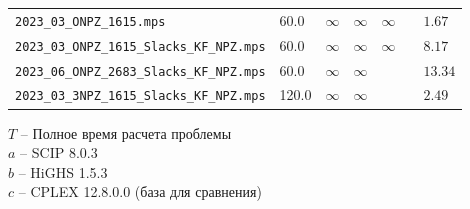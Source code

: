 \documentclass[%
	11pt,
	a4paper,
	utf8,
		]{article}
\begin{document}
\begin{landscape}
{\begin{table}[!h]
\begin{tabular}{ p{} | p{1.4cm} | p{0.7cm} | p{2.3cm} | p{2.5cm} | p{2.7cm} | p{1.4cm} }
			\rowcolor{blue!3}\texttt{2023\_03\_ONPZ\_1615.mps} & 60.0 & $ \infty $ & $ \infty $ & $ \infty $ & \ccg{$ 1.31 (+21.72\%) $} & $ 1.67 $\\
			\rowcolor{black!5}\texttt{2023\_03\_ONPZ\_1615\_Slacks\_KF\_NPZ.mps} & 60.0 & $ \infty $ & $ \infty $ & $ \infty $ & \ccb{ $ 10.13 (-24.10\%) $ } & $ 8.17 $ \\
			\rowcolor{blue!3}\texttt{2023\_06\_ONPZ\_2683\_Slacks\_KF\_NPZ.mps} & 60.0 & $ \infty $ & $ \infty $ & \ccg{ $ 6.40 (+52.05\%) $ } & \ccg{ $ 3.54 (+73.48\%) $ } & $ 13.34 $ \\
			\noalign{\smallskip}  
			\rowcolor{black!5}\texttt{2023\_03\_3NPZ\_1615\_Slacks\_KF\_NPZ.mps} &120.0 & $ \infty $ & $ \infty $ & \ccb{$ 2.64 (-6.16\%) $} & \ccg{ $ 1.36 (+45.41\%) $ } & $ 2.49 $ \\
		\end{tabular}		
	\end{table}
    \vspace*{-3mm}
	\hspace*{5mm}$ T $ -- {\footnotesize Полное время расчета проблемы}\\[-7mm]
	
	\hspace*{5mm}$ a $ -- {\footnotesize SCIP 8.0.3}\\[-7mm]
	
	\hspace*{5mm}$ b $ -- {\footnotesize HiGHS 1.5.3}\\[-7mm]
	
	\hspace*{5mm}$ c $ -- {\footnotesize CPLEX 12.8.0.0 (база для сравнения)}\\[-7mm]
}
\end{landscape}
\end{document}
